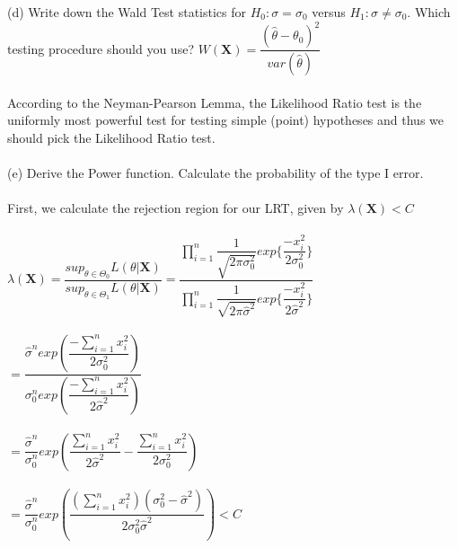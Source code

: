 \documentclass{article}
\begin{document}
(d) Write down the Wald Test statistics for $H_0:\sigma=\sigma_0$ versus $H_1:\sigma\neq\sigma_0$.  Which testing procedure should you use?
$W(\textbf{X})=\dfrac{(\hat{\theta}-\theta_0)^2}{var(\hat{\theta})}$\\\\
According to the Neyman-Pearson Lemma, the Likelihood Ratio test is the uniformly most powerful test for testing simple (point) hypotheses and thus we should pick the Likelihood Ratio test.\\\\
(e) Derive the Power function.  Calculate the probability of the type I error.\\\\
First, we calculate the rejection region for our LRT, given by $\lambda(\textbf{X})<C$\\\\
$\lambda(\textbf{X})=\dfrac{sup_{\theta\in\Theta_0}L(\theta|\textbf{X})}{sup_{\theta\in\Theta_1}L(\theta|\textbf{X})}=\dfrac{\prod_{i=1}^n\dfrac{1}{\sqrt{2\pi\sigma_0^2}}exp\{\dfrac{-x_i^2}{2\sigma_0^2}\}}{\prod_{i=1}^n\dfrac{1}{\sqrt{2\pi\hat{\sigma}^2}}exp\{\dfrac{-x_i^2}{2\hat{\sigma}^2}\}}$\\\\
$=\dfrac{\hat{\sigma}^nexp(\dfrac{-\sum_{i=1}^nx_i^2}{2\sigma_0^2})}{\sigma_0^nexp(\dfrac{-\sum_{i=1}^nx_i^2}{2\hat{\sigma}^2})}$\\\\
$=\dfrac{\hat{\sigma}^n}{\sigma_0^n}exp(\dfrac{\sum_{i=1}^nx_i^2}{2\hat{\sigma}^2}-\dfrac{\sum_{i=1}^nx_i^2}{2\sigma_0^2})$\\\\
$=\dfrac{\hat{\sigma}^n}{\sigma_0^n}exp(\dfrac{(\sum_{i=1}^nx_i^2)(\sigma_0^2-\hat{\sigma}^2)}{2\sigma_0^2\hat{\sigma}^2})<C$\\\\
\pagebreak
\end{document}
